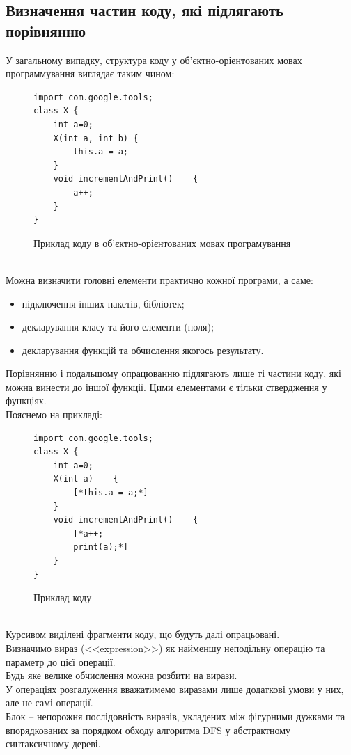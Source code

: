 \documentclass[a4paper, 14pt]{article}
\begin{document}
\subsection{Визначення частин коду, які підлягають порівнянню}
У загальному випадку, структура коду у об'єктно-оріентованих мовах программування виглядає таким чином: \\
\begin{figure}[h!]
\begin{lstlisting}[frame=none, xleftmargin=.3\textwidth]
import com.google.tools;
class X {
	int a=0;
	X(int a, int b)	{
		this.a = a;
	}
	void incrementAndPrint()	{
		a++;
	}
}
\end{lstlisting}
\caption{Приклад коду в об'єктно-орієнтованих мовах програмування}
\end{figure} \\
Можна визначити головні елементи практично кожної програми, а саме:
\begin{itemize}
\item підключення інших пакетів, бібліотек;
\item декларування класу та його елементи (поля);
\item декларування функцій та обчислення якогось результату.
\end{itemize}
Порівнянню і подальшому опрацюванню підлягають лише ті частини коду, які можна винести до іншої функції.
Цими елементами є тільки ствердження у функціях.\\
Пояснемо на прикладі: \\
\begin{figure}[h!]
\begin{lstlisting}[frame=none, xleftmargin=.3\textwidth]
import com.google.tools;
class X {
	int a=0;
	X(int a)	{
		[*this.a = a;*]
	}
	void incrementAndPrint()	{
		[*a++;
		print(a);*]
	}
}
\end{lstlisting}
\caption{Приклад коду}
\end{figure} \\
Курсивом виділені фрагменти коду, що будуть далі опрацьовані. \\
Визначимо вираз (<<expression>>) як найменшу неподільну операцію та параметр до цієї операції. \\ Будь яке велике обчислення можна розбити на вирази. \\
У операціях розгалуження вважатимемо виразами лише додаткові умови у них, але не самі операції. \\
Блок -- непорожня послідовність виразів, укладених між фігурними дужками та впорядкованих за порядком обходу алгоритма DFS у абстрактному синтаксичному дереві. \\
\end{document}

